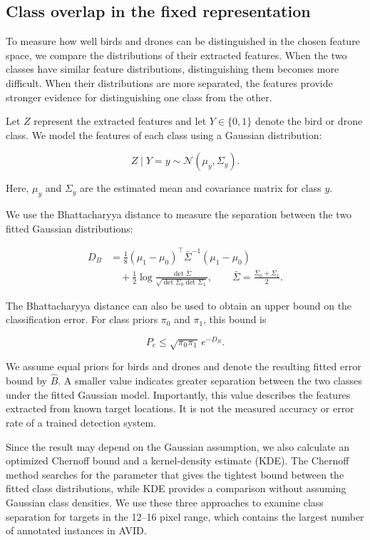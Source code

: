 \documentclass[10pt]{article}
\newcommand{\dataset}{\textsc{AVID}}
\newcommand{\Bhat}{\widehat B}
\begin{document}
\subsection{Class overlap in the fixed representation}

To measure how well birds and drones can be distinguished in the chosen feature space, we compare the distributions of their extracted features. When the two classes have similar feature distributions, distinguishing them becomes more difficult. When their distributions are more separated, the features provide stronger evidence for distinguishing one class from the other.

Let $Z$ represent the extracted features and let $Y\in\{0,1\}$ denote the bird or drone class. We model the features of each class using a Gaussian distribution:

\begin{equation}
Z \mid Y=y \sim \mathcal{N}(\mu_y,\Sigma_y).
\end{equation}

Here, $\mu_y$ and $\Sigma_y$ are the estimated mean and covariance matrix for class $y$.

We use the Bhattacharyya distance to measure the separation between the two fitted Gaussian distributions:

\begin{align}
D_B
&=
\frac{1}{8}
(\mu_1-\mu_0)^\top
\bar{\Sigma}^{-1}
(\mu_1-\mu_0)
\\
&\quad+
\frac{1}{2}
\log
\frac{\det\bar{\Sigma}}
{\sqrt{\det\Sigma_0\det\Sigma_1}},
\qquad
\bar{\Sigma}
=
\frac{\Sigma_0+\Sigma_1}{2}.
\end{align}

The Bhattacharyya distance can also be used to obtain an upper bound on the classification error. For class priors $\pi_0$ and $\pi_1$, this bound is

\begin{equation}
P_e
\leq
\sqrt{\pi_0\pi_1}\,
e^{-D_B}.
\label{eq:bhatt}
\end{equation}

We assume equal priors for birds and drones and denote the resulting fitted error bound by $\Bhat$. A smaller value indicates greater separation between the two classes under the fitted Gaussian model. Importantly, this value describes the features extracted from known target locations. It is not the measured accuracy or error rate of a trained detection system.

Since the result may depend on the Gaussian assumption, we also calculate an optimized Chernoff bound and a kernel-density estimate (KDE). The Chernoff method searches for the parameter that gives the tightest bound between the fitted class distributions, while KDE provides a comparison without assuming Gaussian class densities. We use these three approaches to examine class separation for targets in the 12--16 pixel range, which contains the largest number of annotated instances in \dataset{}.
\end{document}

